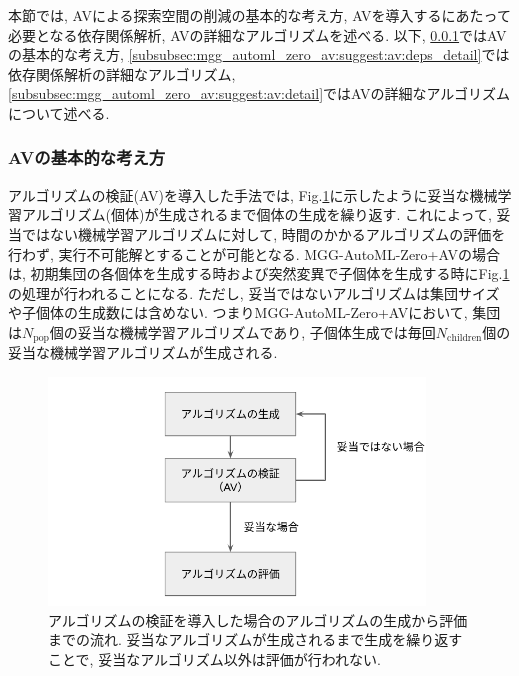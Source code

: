 \documentclass[11pt,oneside,openany,report]{jsbook}
\begin{document}
本節では, AVによる探索空間の削減の基本的な考え方, AVを導入するにあたって必要となる依存関係解析, AVの詳細なアルゴリズムを述べる. 以下, \ref{subsubsec:mgg_automl_zero_av:suggest:av:basic}ではAVの基本的な考え方, \ref{subsubsec:mgg_automl_zero_av:suggest:av:deps_detail}では依存関係解析の詳細なアルゴリズム, \ref{subsubsec:mgg_automl_zero_av:suggest:av:detail}ではAVの詳細なアルゴリズムについて述べる.

\subsubsection{AVの基本的な考え方}\label{subsubsec:mgg_automl_zero_av:suggest:av:basic}

アルゴリズムの検証(AV)を導入した手法では, Fig.\ref{fig:av}に示したように妥当な機械学習アルゴリズム(個体)が生成されるまで個体の生成を繰り返す. これによって, 妥当ではない機械学習アルゴリズムに対して, 時間のかかるアルゴリズムの評価を行わず, 実行不可能解とすることが可能となる. MGG-AutoML-Zero+AVの場合は, 初期集団の各個体を生成する時および突然変異で子個体を生成する時にFig.\ref{fig:av}の処理が行われることになる. ただし, 妥当ではないアルゴリズムは集団サイズや子個体の生成数には含めない. つまりMGG-AutoML-Zero+AVにおいて, 集団は$N_\mathrm{pop}$個の妥当な機械学習アルゴリズムであり, 子個体生成では毎回$N_\mathrm{children}$個の妥当な機械学習アルゴリズムが生成される.

\begin{figure}
  \centering
  \includegraphics[width=10cm]{av.png}
  \caption{アルゴリズムの検証を導入した場合のアルゴリズムの生成から評価までの流れ. 妥当なアルゴリズムが生成されるまで生成を繰り返すことで, 妥当なアルゴリズム以外は評価が行われない. }
  \label{fig:av}
\end{figure}
\end{document}
